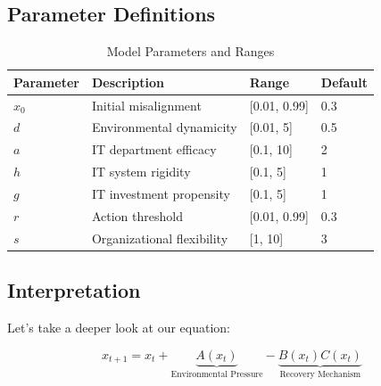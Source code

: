 \documentclass[a4paper, 10pt]{article}
\begin{document}
\subsection{Parameter Definitions}
\begin{table}[h]
	\centering
	\caption{Model Parameters and Ranges}
	\begin{tabular}{llll}
		\toprule
		\textbf{Parameter} & \textbf{Description}       & \textbf{Range} & \textbf{Default} \\
		\midrule
		$x_0$              & Initial misalignment       & [0.01, 0.99]   & 0.3              \\
		$d$                & Environmental dynamicity   & [0.01, 5]      & 0.5              \\
		$a$                & IT department efficacy     & [0.1, 10]      & 2                \\
		$h$                & IT system rigidity         & [0.1, 5]       & 1                \\
		$g$                & IT investment propensity   & [0.1, 5]       & 1                \\
		$r$                & Action threshold           & [0.01, 0.99]   & 0.3              \\
		$s$                & Organizational flexibility & [1, 10]        & 3                \\
		\bottomrule
	\end{tabular}
\end{table}

\subsection{Interpretation}
Let's take a deeper look at our equation:

\begin{equation}
	x_{t + 1} = x_t + \underbrace{A(x_t)}_{\text{Environmental Pressure}} - \underbrace{B(x_t)C(x_t)}_{\text{Recovery Mechanism}}
\end{equation}
\end{document}

